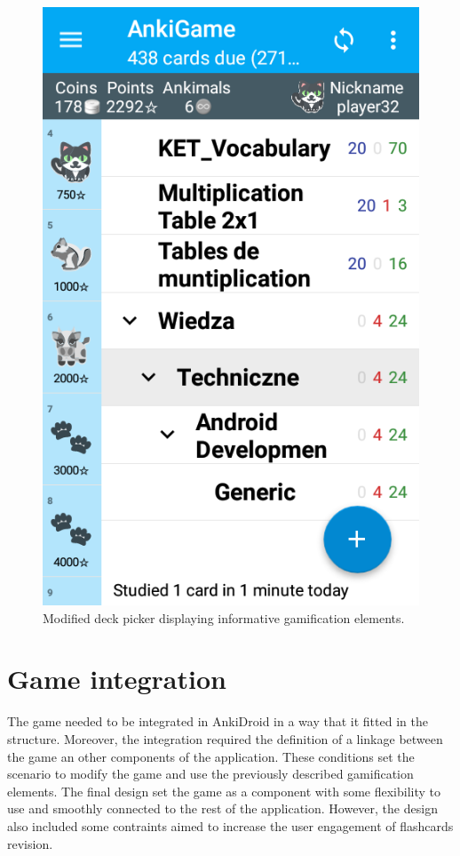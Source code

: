 \begin{figure}[htb]
    \vskip 5mm
        \begin{center}
            \includegraphics[scale=0.4]{./Figures/progress.png}
            \caption{Modified deck picker displaying informative gamification elements.}
            \label{fig:progress}
        \end{center}
    \vskip -5mm
\end{figure}

\section{Game integration}
The game needed to be integrated in AnkiDroid in a way that it fitted in the structure. Moreover, the integration required the definition of a linkage between the game an other components of the application. These conditions set the scenario to modify the game and use the previously described gamification elements. The final design set the game as a component with some flexibility to use and smoothly connected to the rest of the application. However, the design also included some contraints aimed to increase the user engagement of flashcards revision.


